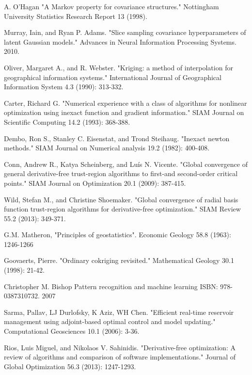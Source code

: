 \documentclass[a4paper,onecolumn]{article}
\theoremstyle{remark}
\begin{document}
\begin{thebibliography}{9}
A. O'Hagan 
"A Markov property for covariance structures." 
Nottingham University Statistics Research Report 13 (1998).

Murray, Iain, and Ryan P. Adams. 
"Slice sampling covariance hyperparameters of latent Gaussian models." 
Advances in Neural Information Processing Systems. 2010.

Oliver, Margaret A., and R. Webster. 
"Kriging: a method of interpolation for geographical information systems." 
International Journal of Geographical Information System 4.3 (1990): 313-332.

Carter, Richard G. 
"Numerical experience with a class of algorithms for nonlinear optimization using inexact function and gradient information." 
SIAM Journal on Scientific Computing 14.2 (1993): 368-388.

Dembo, Ron S., Stanley C. Eisenstat, and Trond Steihaug. 
"Inexact newton methods." 
SIAM Journal on Numerical analysis 19.2 (1982): 400-408.

Conn, Andrew R., Katya Scheinberg, and Luís N. Vicente. 
"Global convergence of general derivative-free trust-region algorithms to first-and second-order critical points." 
SIAM Journal on Optimization 20.1 (2009): 387-415.

Wild, Stefan M., and Christine Shoemaker. 
"Global convergence of radial basis function trust-region algorithms for derivative-free optimization." 
SIAM Review 55.2 (2013): 349-371.

G.M. Matheron,
"Principles of geostatistics".
Economic Geology 58.8 (1963): 1246-1266

Goovaerts, Pierre. 
"Ordinary cokriging revisited." 
Mathematical Geology 30.1 (1998): 21-42.

Christopher M. Bishop
Pattern recognition and machine learning
ISBN: 978-0387310732. 2007

Sarma, Pallav, LJ Durlofsky, K Aziz, WH Chen. 
"Efficient real-time reservoir management using adjoint-based optimal control and model updating." 
Computational Geosciences 10.1 (2006): 3-36.

Rios, Luis Miguel, and Nikolaos V. Sahinidis. 
"Derivative-free optimization: A review of algorithms and comparison of software implementations." 
Journal of Global Optimization 56.3 (2013): 1247-1293.


\end{thebibliography}
\end{document}
